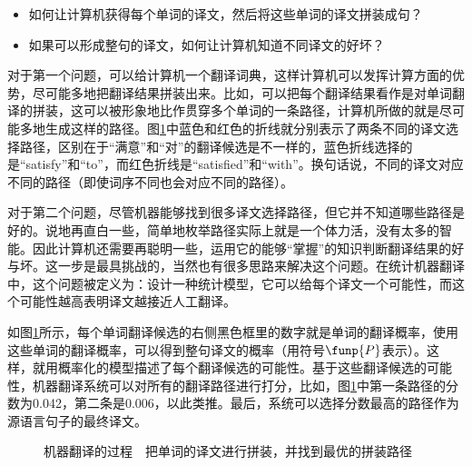 \begin{itemize}
\vspace{0.5em}
\item 如何让计算机获得每个单词的译文，然后将这些单词的译文拼装成句？
\vspace{0.5em}
\item 如果可以形成整句的译文，如何让计算机知道不同译文的好坏？
\vspace{0.5em}
\end{itemize}

\parinterval 对于第一个问题，可以给计算机一个翻译词典，这样计算机可以发挥计算方面的优势，尽可能多地把翻译结果拼装出来。比如，可以把每个翻译结果看作是对单词翻译的拼装，这可以被形象地比作贯穿多个单词的一条路径，计算机所做的就是尽可能多地生成这样的路径。图\ref{fig:5-4}中蓝色和红色的折线就分别表示了两条不同的译文选择路径，区别在于“满意”和“对”的翻译候选是不一样的，蓝色折线选择的是“satisfy”和“to”，而红色折线是“satisfied”和“with”。换句话说，不同的译文对应不同的路径（即使词序不同也会对应不同的路径）。

\parinterval 对于第二个问题，尽管机器能够找到很多译文选择路径，但它并不知道哪些路径是好的。说地再直白一些，简单地枚举路径实际上就是一个体力活，没有太多的智能。因此计算机还需要再聪明一些，运用它的能够“掌握”的知识判断翻译结果的好与坏。这一步是最具挑战的，当然也有很多思路来解决这个问题。在统计机器翻译中，这个问题被定义为：设计一种统计模型，它可以给每个译文一个可能性，而这个可能性越高表明译文越接近人工翻译。

\parinterval 如图\ref{fig:5-4}所示，每个单词翻译候选的右侧黑色框里的数字就是单词的翻译概率，使用这些单词的翻译概率，可以得到整句译文的概率（用符号$\funp{P}$表示）。这样，就用概率化的模型描述了每个翻译候选的可能性。基于这些翻译候选的可能性，机器翻译系统可以对所有的翻译路径进行打分，比如，图\ref{fig:5-4}中第一条路径的分数为0.042，第二条是0.006，以此类推。最后，系统可以选择分数最高的路径作为源语言句子的最终译文。

\begin{figure}[htp]
    \centering

    \caption{机器翻译的过程\ \dash \ 把单词的译文进行拼装，并找到最优的拼装路径}
    \label{fig:5-4}
\end{figure}


